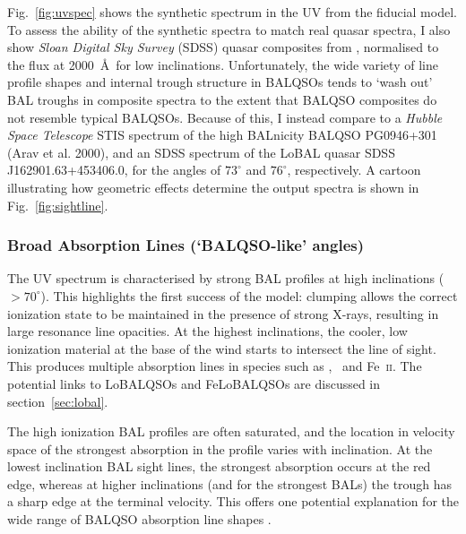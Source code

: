 \noindent
Fig.~\ref{fig:uvspec} shows the synthetic spectrum in the UV from the fiducial model. 
To assess the ability of the synthetic spectra to match real 
quasar spectra, I also show {\sl Sloan Digital Sky Survey} (SDSS) quasar
composites from \cite{reichard2003}, normalised to the flux at 2000~\AA\
for low inclinations. Unfortunately, the wide variety of
line profile shapes and internal trough structure in BALQSOs
tends to `wash out' BAL troughs in composite spectra
to the extent that BALQSO composites do not resemble typical BALQSOs.
Because of this, I instead compare to a {\sl Hubble Space Telescope} 
STIS spectrum of the high BALnicity BALQSO PG0946+301 (Arav et al. 2000),
and an SDSS spectrum of the LoBAL quasar SDSS J162901.63+453406.0,
for the angles of $73^\circ$ and $76^\circ$, respectively. 
A cartoon illustrating how geometric effects determine
the output spectra is shown in Fig.~\ref{fig:sightline}.  

\subsubsection{Broad Absorption Lines (`BALQSO-like' angles)}
\label{sec:balqso_angles}

The UV spectrum is characterised by strong BAL 
profiles at high inclinations ($> 70^\circ$). 
This highlights the first success of the model: 
clumping allows the correct ionization state 
to be maintained in the presence of strong X-rays, 
resulting in large resonance line opacities. 
At the highest inclinations, the 
cooler, low ionization material at the base of the wind
starts to intersect the line of sight. This produces 
multiple absorption lines in species such as \mg,
\al\ and Fe~\textsc{ii}. The potential links to LoBALQSOs and 
FeLoBALQSOs are discussed in section~\ref{sec:lobal}.

The high ionization BAL profiles are often saturated, and the location in velocity space
of the strongest absorption in the profile varies with inclination.
At the lowest inclination BAL sight lines, the strongest absorption occurs at the red edge,
whereas at higher inclinations (and for the strongest BALs)
the trough has a sharp edge at the terminal velocity.
This offers one potential explanation for the wide range of BALQSO absorption
line shapes \citep[see e.g.][]{trump2006,knigge2008,filizak2014}.

